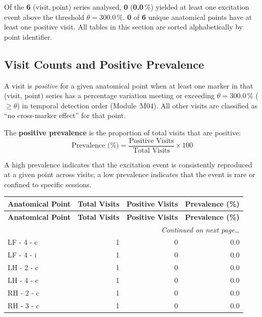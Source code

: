 \documentclass[a4paper,11pt]{article}
\begin{document}
\noindent
Of the \textbf{6} (visit,\,point) series analysed,
\textbf{0} (\textbf{0.0}\,\%) yielded at least one
excitation event above the threshold $\theta = 300.0\,\%$.
\textbf{0} of \textbf{6} unique anatomical points
have at least one positive visit.
All tables in this section are sorted alphabetically by point identifier.

\subsection{Visit Counts and Positive Prevalence}

A visit is \emph{positive} for a given anatomical point when at least one marker in that
(visit, point) series has a percentage variation meeting or exceeding
$\theta = 300.0\,\%$ ($\geq \theta$) in temporal detection order (Module~M04).
All other visits are classified as ``no cross-marker effect'' for that point.

The \textbf{positive prevalence} is the proportion of total visits that are positive:
\[
  \text{Prevalence (\%)} = \frac{\text{Positive Visits}}{\text{Total Visits}} \times 100
\]

A high prevalence indicates that the excitation event is consistently reproduced at a given
point across visits; a low prevalence indicates that the event is rare or confined to
specific sessions.

\begin{small}
\begin{longtable}{p{5cm}rrr}
\toprule
\textbf{Anatomical Point} &
\textbf{Total Visits} &
\textbf{Positive Visits} &
\textbf{Prevalence (\%)} \\
\midrule
\endfirsthead
\toprule
\textbf{Anatomical Point} &
\textbf{Total Visits} &
\textbf{Positive Visits} &
\textbf{Prevalence (\%)} \\
\midrule
\endhead
\midrule
\multicolumn{4}{r}{\small\emph{Continued on next page\ldots}} \\
\endfoot
\bottomrule
\endlastfoot
LF - 4 - c & 1 & 0 & 0.0 \\
LF - 4 - i & 1 & 0 & 0.0 \\
LH - 2 - c & 1 & 0 & 0.0 \\
LH - 4 - c & 1 & 0 & 0.0 \\
RH - 2 - c & 1 & 0 & 0.0 \\
RH - 3 - c & 1 & 0 & 0.0 \\
\end{longtable}
\end{small}
\end{document}
